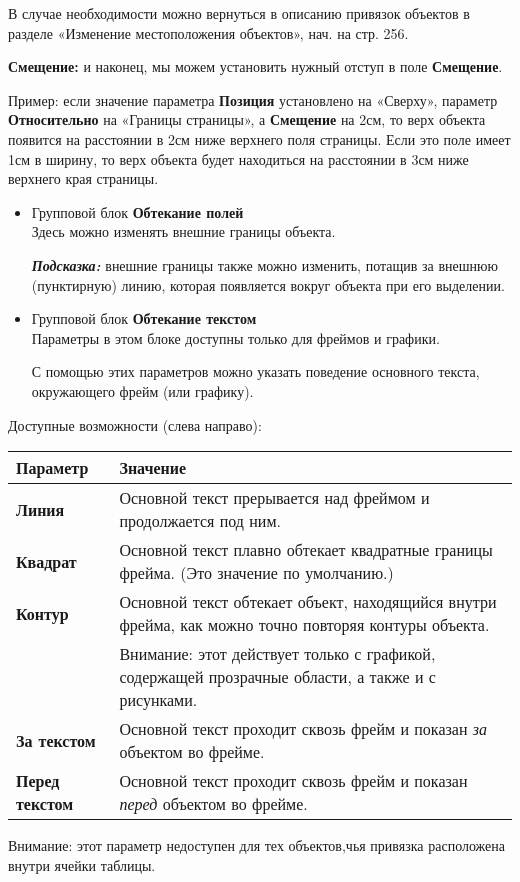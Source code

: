 ﻿\documentclass[a4paper,10pt]{article}
\begin{document}
В случае необходимости можно вернуться в описанию привязок объектов в разделе «Изменение местоположения объектов», нач. на стр. 256.

\textbf{Смещение:} и наконец, мы можем установить нужный отступ в поле \textbf{Смещение}.

Пример: если значение параметра \textbf{Позиция} установлено на «Сверху», параметр \textbf{Относительно} на «Границы страницы», а \textbf{Смещение} на 2см, то верх объекта появится на расстоянии в 2см ниже верхнего поля страницы. Если это поле имеет 1см в ширину, то верх объекта будет находиться на расстоянии в 3см ниже верхнего края страницы.

\begin{itemize}
 \item Групповой блок \textbf{Обтекание полей}\\
 Здесь можно изменять внешние границы объекта.
 
 \textbf{\textit{Подсказка:}} внешние границы также можно изменить, потащив за внешнюю (пунктирную) линию, которая появляется вокруг объекта при его выделении.
 \item Групповой блок \textbf{Обтекание текстом}\\
 Параметры в этом блоке доступны только для фреймов и графики.
 
 С помощью этих параметров можно указать поведение основного текста, окружающего фрейм (или графику).
\end{itemize}

Доступные возможности (слева направо):

\begin{center}
\begin{tabular}{  m{4cm}  m{12cm}  }
 \textbf{Параметр} & \textbf{Значение}\\ 
 \hline
  \textbf{Линия} & Основной текст прерывается над фреймом и продолжается под ним.\\
  \textbf{Квадрат} & Основной текст плавно обтекает квадратные границы фрейма. (Это значение по умолчанию.)\\ 
\textbf{Контур} & Основной текст обтекает объект, находящийся внутри фрейма, как можно точно повторяя контуры объекта.\\
 & Внимание: этот действует только с графикой, содержащей прозрачные области, а также и с рисунками.\\
\textbf{За текстом} & Основной текст проходит сквозь фрейм и показан \textit{за} объектом во фрейме.\\
\textbf{Перед текстом} & Основной текст проходит сквозь фрейм и показан \textit{перед} объектом во фрейме.\\
\end{tabular}
\end{center}
 Внимание: этот параметр недоступен для тех объектов,чья привязка расположена внутри ячейки таблицы.
 
\end{document}
